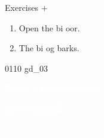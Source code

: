 \documentclass[aspectratio=169,xcolor={dvipsnames,table}]{beamer}
\begin{document}
\begin{frame}[plain]{Exercises  $+$ }
  \Large
  \begin{enumerate}
    \item<2-> Open the bi  oor.
    \item<4-> The bi  og barks.
  \end{enumerate}

  \hfill{\tiny 0110}\,{\scriptsize {}\,gd\_03}

\end{frame}
\begin{frame}
  \hypertarget{today}{}
  \centering
  \textcolor{white}{\Huge\bfseries Today's Pronunciation}

  \vspace{30pt}

  \textcolor{white}{\Large 連続する破裂音}

  \textcolor{white}{\Large {} $+$ }
\end{frame}
\end{document}
